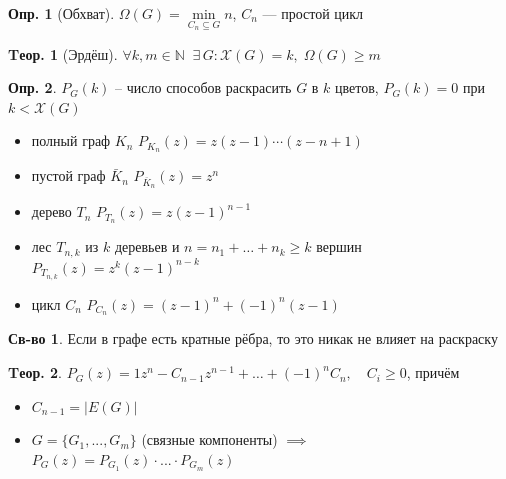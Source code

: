 \documentclass[a4paper,12pt]{article}
\theoremstyle{definition}
\newtheorem{definition}{Опр.}[section]
\newtheorem*{property}{Св-во}  %
\theoremstyle{definition}
\newtheorem{theorem}{Tеор.}[section]
\def\iiChi{\mathcal{X}}
\begin{document}
\begin{definition}[Обхват]
	$\Omega(G) = \min \limits_{C_n \subseteq G} n $, $C_n$ --- простой цикл
\end{definition}

\begin{theorem}[Эрдёш]
	$\forall k,m \in \mathbb{N} \;\; \exists \, G: \iiChi(G)=k, \; \Omega(G) \geqslant m$
\end{theorem}

\begin{definition}
	$P_G(k)$ -- число способов раскрасить $G$ в $k$ цветов, $P_G(k)=0$ при $k<\iiChi(G)$
\end{definition}

\begin{itemize}
	\item полный граф $K_n$ \quad $P_{K_n}(z) = z(z-1)\cdots(z-n+1)$
	\item пустой граф $\bar{K}_n$ \quad $P_{\overline{K}_n}(z) = z^n$
	\item дерево $T_n$ \quad $P_{T_n}(z) = z(z-1)^{n-1}$
	\item лес $T_{n,k}$ из $k$ деревьев и $n=n_1+\dots+n_k \geqslant k$ вершин \quad $P_{T_{n,k}}(z) = z^k(z-1)^{n-k}$
	\item цикл $C_{n}$ \quad $P_{C_{n}}(z) = (z-1)^n + (-1)^n(z-1)$
\end{itemize}

\begin{property}
	Если в графе есть кратные рёбра, то это никак не влияет на раскраску
\end{property}

\begin{theorem}
	$ P_G(z) = 1 z^n - C_{n-1} z^{n-1} +\dots + (-1)^n C_n, \quad C_i \geqslant 0 $,
	причём
	\begin{itemize}
		\item  $C_{n-1} = |E(G)|$
		\item  $G=\{G_1,...,G_m\}$ (связные компоненты)
		       $\implies$ $P_G(z) = P_{G_1}(z) \cdot ... \cdot P_{G_m}(z)$ 
	\end{itemize}
\end{theorem}

\def\iiRemoveEdge{-}
\def\iiPullEdge{\sim}
\end{document}
